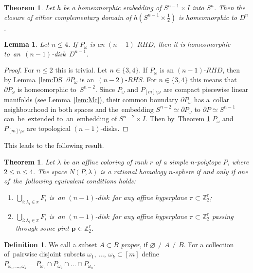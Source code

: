 \documentclass[12pt]{amsart}
\newtheorem{lemma}[formula]{Lemma}
\newtheorem{theorem}[formula]{Theorem}
\theoremstyle{definition}
\newtheorem{definition}[formula]{Definition}
\theoremstyle{remark}
\begin{document}
\begin{theorem}\cite[Theorem 5]{B60}\label{th:GST} Let $h$ be a homeomorphic embedding of $S^{n-1}\times I$ into $S^n$.
Then the closure of either complementary domain of $h(S^{n-1}\times\frac{1}{2})$ is homeomorphic to $D^n$.
\end{theorem}
\begin{lemma}\label{lem:rhd4}
Let $n\leqslant 4$. If $P_{\omega}$ is an $(n-1)$-$RHD$, then it is homeomorphic 
to~an~$(n-1)$-disk~$D^{n-1}$. 
\end{lemma}
\begin{proof}
For $n\leqslant 2$ this is trivial. Let $n\in\{3,4\}$. If $P_{\omega}$ is an $(n-1)$-$RHD$, 
then by Lemma~\ref{lem:DS} $\partial P_{\omega}$ is an~$(n-2)$-$RHS$. For $n\in\{3,4\}$ 
this means that $\partial P_{\omega}$ is homeomorphic to~$S^{n-2}$.
Since $P_{\omega}$ and $P_{[m]\setminus\omega}$  are compact piecewise linear manifolds (see Lemma~\ref{lem:Mc}), 
their common
boundary $\partial P_{\omega}$ has a~collar neighbourhood in both spaces and the~embedding  
$S^{n-2}\simeq \partial P_{\omega}$ to $\partial P\simeq S^{n-1}$
can~be~extended to~an~embedding of $S^{n-2}\times I$. Then by~Theorem \ref{th:GST} $P_{\omega}$
and $P_{[m]\setminus\omega}$ are topological $(n-1)$-disks. 
\end{proof}
This leads to the following result.
\begin{theorem}\label{th:rhs34}
Let $\lambda$ be an affine coloring of rank $r$ of a simple $n$-polytope $P$, where $2\leqslant n\leqslant 4$.
The space $N(P,\lambda)$ is a rational homology $n$-sphere if and only if 
one of~the~following equivalent conditions holds:
\begin{enumerate}
\item $\bigcup\limits_{i\colon \lambda_i\in \pi }F_i$ is~an $(n-1)$-disk~for any affine hyperplane $\pi\subset\mathbb Z_2^r$;
\item  $\bigcup\limits_{i\colon \lambda_i\in \pi }F_i$ is~an $(n-1)$-disk~for any affine hyperplane $\pi\subset\mathbb Z_2^r$
passing through some  pint $\boldsymbol{p}\in\mathbb Z_2^r$.
\end{enumerate}
\end{theorem}
\begin{definition}
We call a subset $A\subset B$ {\it proper}, if $\varnothing\ne A\ne B$. For a collection 
of~pairwise disjoint subsets  $\omega_1$, $\dots$, $\omega_k \subset [m]$ define 
$P_{\omega_1,\dots,\omega_k}=P_{\omega_1}\cap P_{\omega_2}\cap\dots\cap P_{\omega_k}$.
\end{definition}
\end{document}
